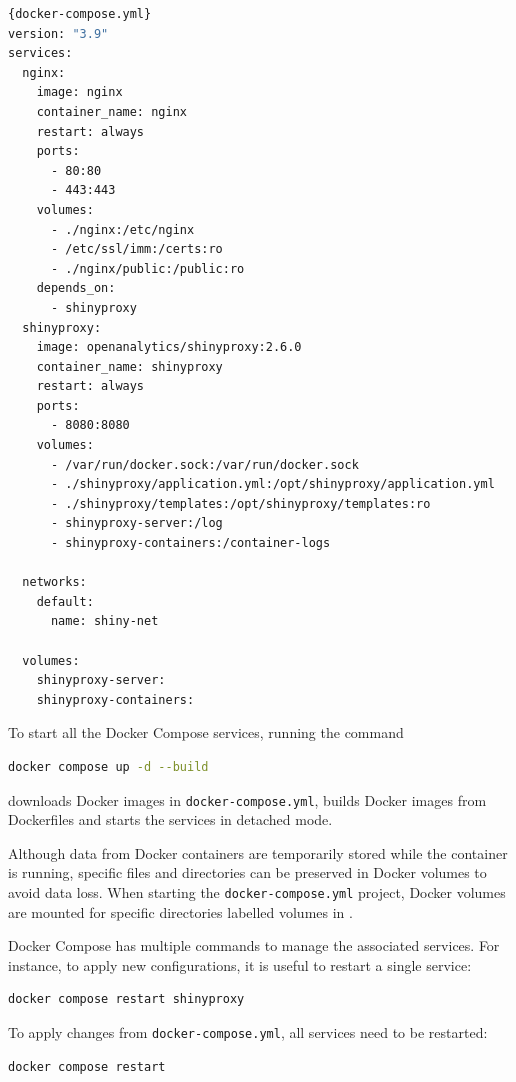 \begin{lstlisting}[caption=Shortened version of the \texttt{docker-compose.yml} file used for the project. This version only contains the configuration for Nginx and ShinyProxy.,language=bash,label={lst:docker-compose.yml}]{docker-compose.yml}
version: "3.9"
services:
  nginx:
    image: nginx
    container_name: nginx
    restart: always
    ports:
      - 80:80
      - 443:443
    volumes:
      - ./nginx:/etc/nginx
      - /etc/ssl/imm:/certs:ro
      - ./nginx/public:/public:ro
    depends_on:
      - shinyproxy
  shinyproxy:
    image: openanalytics/shinyproxy:2.6.0
    container_name: shinyproxy
    restart: always
    ports:
      - 8080:8080
    volumes:
      - /var/run/docker.sock:/var/run/docker.sock
      - ./shinyproxy/application.yml:/opt/shinyproxy/application.yml
      - ./shinyproxy/templates:/opt/shinyproxy/templates:ro
      - shinyproxy-server:/log
      - shinyproxy-containers:/container-logs
      
  networks:
    default:
      name: shiny-net
      
  volumes:
    shinyproxy-server:
    shinyproxy-containers:
\end{lstlisting}

To start all the Docker Compose services, running the command
\begin{lstlisting}[language=bash,numbers=none]
docker compose up -d --build
\end{lstlisting}
downloads Docker images in \texttt{docker-compose.yml}, builds Docker images from Dockerfiles and starts the services in detached mode.

Although data from Docker containers are temporarily stored while the container is running, specific files and directories can be preserved in Docker volumes to avoid data loss. When starting the \texttt{docker-compose.yml} project, Docker volumes are mounted for specific directories labelled volumes in .

Docker Compose has multiple commands to manage the associated services. For instance, to apply new configurations, it is useful to restart a single service:
\begin{lstlisting}[language=bash,numbers=none]
docker compose restart shinyproxy
\end{lstlisting}

To apply changes from \texttt{docker-compose.yml}, all services need to be restarted:
\begin{lstlisting}[language=bash,numbers=none]
docker compose restart
\end{lstlisting}

